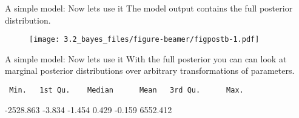 \documentclass[
  11pt,
  ignorenonframetext,
]{beamer}
\newenvironment{Shaded}{\begin{snugshade}}{\end{snugshade}}
\newcommand{\FunctionTok}[1]{\textcolor[rgb]{0.28,0.35,0.67}{#1}}
\newcommand{\NormalTok}[1]{\textcolor[rgb]{0.00,0.23,0.31}{#1}}
\newcommand{\OtherTok}[1]{\textcolor[rgb]{0.00,0.23,0.31}{#1}}
\newcommand{\SpecialCharTok}[1]{\textcolor[rgb]{0.37,0.37,0.37}{#1}}
\begin{document}
\begin{frame}[fragile]{A simple model: Now lets use it}
\protect\hypertarget{a-simple-model-now-lets-use-it-2}{}
The model output contains the full posterior distribution.

\begin{Shaded}
\end{Shaded}

\begin{figure}

{\centering \texttt{[image: 3.2\_bayes\_files/figure-beamer/figpostb-1.pdf]}

}

\end{figure}
\end{frame}

\begin{frame}[fragile]{A simple model: Now lets use it}
\protect\hypertarget{a-simple-model-now-lets-use-it-3}{}
With the full posterior you can can look at marginal posterior
distributions over arbitrary transformations of parameters.

\begin{Shaded}
\end{Shaded}

\begin{verbatim}
 Min.   1st Qu.    Median      Mean   3rd Qu.      Max. 
\end{verbatim}

-2528.863 -3.834 -1.454 0.429 -0.159 6552.412
\end{frame}
\end{document}
